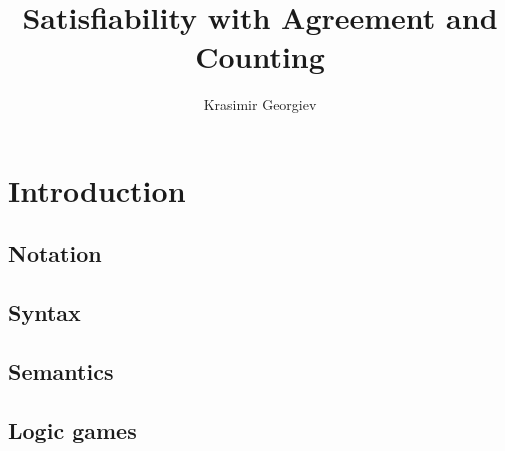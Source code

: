 \documentclass{scrbook}
\begin{document}
\frontmatter
\title{Satisfiability with Agreement and Counting}
\author{Krasimir Georgiev}
\maketitle
\tableofcontents
\printglossary[style=mcolindex]

\mainmatter
\chapter{Introduction}
\section{Notation}











\section{Syntax}







\section{Semantics}






\section{Logic games}\label{sec:logic-games}

\end{document}
